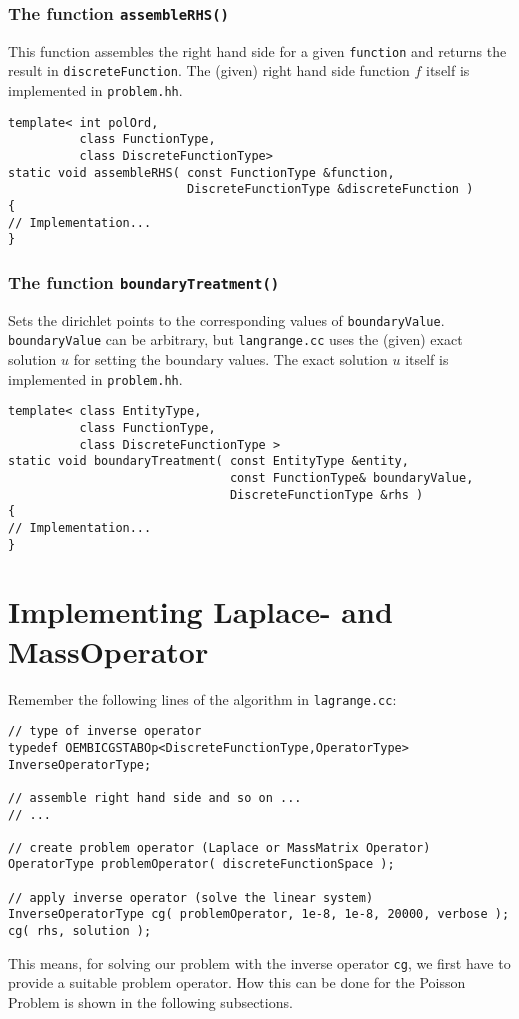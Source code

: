 \subsubsection*{The function \texttt{assembleRHS()} }
This function assembles the right hand side for a given \texttt{function} and returns the result in \texttt{discreteFunction}.
The (given) right hand side function $f$ itself is implemented in \texttt{problem.hh}.
\begin{lstlisting}
template< int polOrd,
          class FunctionType,
          class DiscreteFunctionType>
static void assembleRHS( const FunctionType &function,
                         DiscreteFunctionType &discreteFunction )
{
// Implementation...
}
\end{lstlisting}

\subsubsection*{The function \texttt{boundaryTreatment()} } \label{boundaryTreatment}
Sets the dirichlet points to the corresponding values of \texttt{boundaryValue}. \texttt{boundaryValue} can be arbitrary, but  \texttt{langrange.cc} uses the (given) exact solution $u$ for setting the boundary values.
The exact solution $u$ itself is implemented in \texttt{problem.hh}.
\begin{lstlisting}
template< class EntityType,
          class FunctionType,
          class DiscreteFunctionType >
static void boundaryTreatment( const EntityType &entity,
                               const FunctionType& boundaryValue,
                               DiscreteFunctionType &rhs )
{
// Implementation...
}
\end{lstlisting}




\section{Implementing Laplace- and MassOperator}
Remember the following lines of the algorithm in \texttt{lagrange.cc}:
\begin{lstlisting}
// type of inverse operator
typedef OEMBICGSTABOp<DiscreteFunctionType,OperatorType> InverseOperatorType;

// assemble right hand side and so on ...
// ...

// create problem operator (Laplace or MassMatrix Operator)
OperatorType problemOperator( discreteFunctionSpace );

// apply inverse operator (solve the linear system)
InverseOperatorType cg( problemOperator, 1e-8, 1e-8, 20000, verbose );
cg( rhs, solution );
\end{lstlisting}
This means, for solving our problem with the inverse operator \texttt{cg}, we first have to provide a suitable problem operator.
How this can be done for the Poisson Problem is shown in the following subsections.


